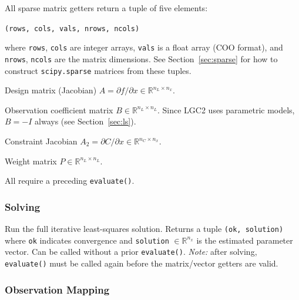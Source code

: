 \documentclass[a4paper,11pt]{article}
\newcommand{\code}[1]{\texttt{#1}}
\begin{document}
All sparse matrix getters return a tuple of five elements:
\begin{center}
    \code{(rows, cols, vals, nrows, ncols)}
\end{center}
where \code{rows}, \code{cols} are integer arrays, \code{vals} is a
float array (COO format), and \code{nrows}, \code{ncols} are the matrix
dimensions. See Section~\ref{sec:sparse} for how to construct
\code{scipy.sparse} matrices from these tuples.

\begin{description}[style=nextline, leftmargin=1.5em]
\item[\code{getFirstDesignMatrix()}]
    Design matrix (Jacobian) $A = \partial f / \partial x \in \mathbb{R}^{n_L \times n_x}$.

\item[\code{getSecondDesignMatrix()}]
    Observation coefficient matrix $B \in \mathbb{R}^{n_L \times n_L}$.
    Since LGC2 uses parametric models, $B = -I$ always (see
    Section~\ref{sec:ls}).

\item[\code{getConstraintDesignMatrix()}]
    Constraint Jacobian $A_2 = \partial C / \partial x \in \mathbb{R}^{n_C \times n_x}$.

\item[\code{getWeightMatrix()}]
    Weight matrix $P \in \mathbb{R}^{n_L \times n_L}$.
\end{description}

All require a preceding \code{evaluate()}.

\subsubsection*{Solving}

\begin{description}[style=nextline, leftmargin=1.5em]
\item[\code{solve() -> (bool, numpy.ndarray)}]
    Run the full iterative least-squares solution. Returns a tuple
    \code{(ok, solution)} where \code{ok} indicates convergence and
    \code{solution} $\in \mathbb{R}^{n_x}$ is the estimated parameter
    vector. Can be called without a prior \code{evaluate()}.
    \emph{Note:} after solving, \code{evaluate()} must be called again
    before the matrix/vector getters are valid.
\end{description}

\subsubsection*{Observation Mapping}
\end{document}
